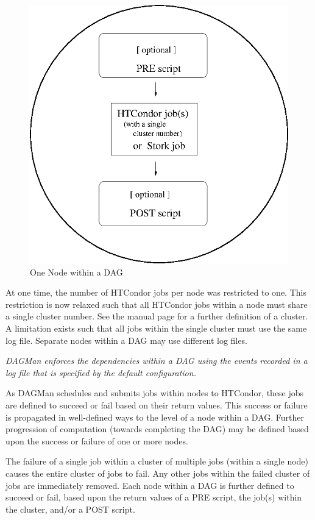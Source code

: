 \begin{figure}[hbt]
\centering
\includegraphics{user-man/dagman-node.eps}
\caption{\label{fig:dagman-node}One Node within a DAG}
\end{figure}

At one time,
the number of HTCondor jobs per node was restricted to one.
This restriction is now relaxed such that all HTCondor jobs
within a node must share a single cluster number.
See the
 manual page
for a further definition of a cluster.
A limitation exists such that
all jobs within the single cluster must use the same log file.
Separate nodes within a DAG may use different log files.

\emph{DAGMan enforces the dependencies within a DAG
using the events recorded in a
log file that is specified by the default configuration.}

As DAGMan schedules and submits jobs within nodes to HTCondor,
these jobs are defined to succeed or fail based on their
return values.
This success or failure is propagated in well-defined ways to the level of
a node within a DAG.
Further progression of computation
(towards completing the DAG)
may be defined based upon the success or failure of one or more nodes.

The failure of a single job within a cluster
of multiple jobs
(within a single node)
causes the entire cluster of jobs to fail.
Any other jobs within the failed cluster of jobs are
immediately removed.
Each node within a DAG is further defined to succeed or fail,
based upon the return values of a PRE script, the job(s)
within the cluster, and/or a POST script.

